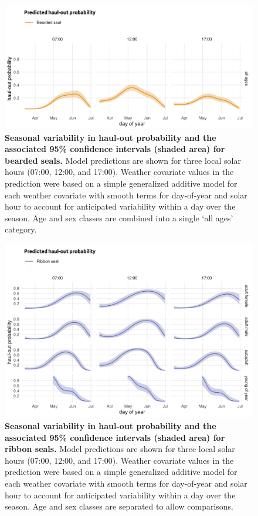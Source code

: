 \documentclass[fleqn,10pt,lineno]{wlpeerj} %
\begin{document}
\begin{figure}
\includegraphics[width=1\linewidth]{../figures/beardedPredSE-1} \caption{\textbf{Seasonal variability in haul-out probability and the associated 95\% confidence intervals (shaded area) for bearded seals.} \linebreak Model predictions are shown for three local solar hours (07:00, 12:00, and 17:00). Weather covariate values in the prediction were based on a simple generalized additive model for each weather covariate with smooth terms for day-of-year and solar hour to account for anticipated variability within a day over the season. Age and sex classes are combined into a single `all ages' category.}\label{fig:beardedPredSE}
\end{figure}



\begin{figure}
\includegraphics[width=1\linewidth]{../figures/ribbonPredSE-1} \caption{\textbf{Seasonal variability in haul-out probability and the associated 95\% confidence intervals (shaded area) for ribbon seals.} \linebreak Model predictions are shown for three local solar hours (07:00, 12:00, and 17:00). Weather covariate values in the prediction were based on a simple generalized additive model for each weather covariate with smooth terms for day-of-year and solar hour to account for anticipated variability within a day over the season. Age and sex classes are separated to allow comparisons.}\label{fig:ribbonPredSE}
\end{figure}
\end{document}
